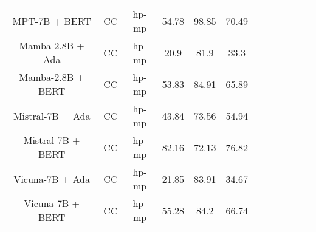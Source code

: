 \begin{table}
\begin{tabular}{|c|c|c|c|c|c|c|c|c|c|c|c|}
	MPT-7B + BERT  & CC & hp-mp  &  54.78 &  98.85 & 70.49  \\
	Mamba-2.8B + Ada  & CC & hp-mp  &  20.9 &  81.9 & 33.3  \\
	Mamba-2.8B + BERT  & CC & hp-mp  &  53.83 &  84.91 & 65.89  \\
	Mistral-7B + Ada  & CC & hp-mp  &  43.84 &  73.56 & 54.94  \\
	Mistral-7B + BERT  & CC & hp-mp  &  82.16 &  72.13 & 76.82  \\
	Vicuna-7B + Ada  & CC & hp-mp  &  21.85 &  83.91 & 34.67  \\
	Vicuna-7B + BERT  & CC & hp-mp  &  55.28 &  84.2 & 66.74  \\
	\hline
\end{tabular}
    \end{table}








